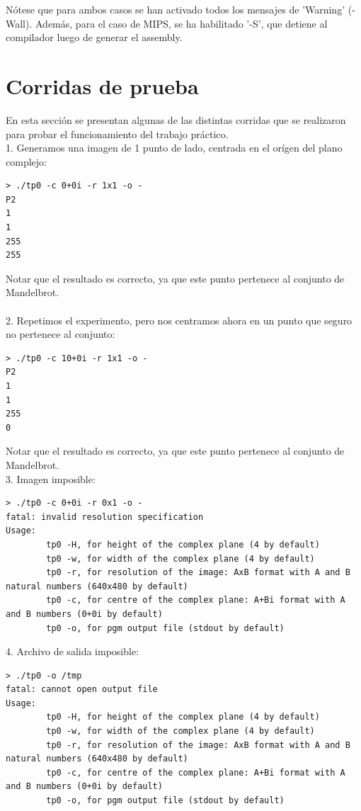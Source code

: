 \documentclass[a4paper,10pt]{article}
\begin{document}
N\'otese que para ambos casos se han activado todos los mensajes de 'Warning' (-Wall). Adem\'as, para el caso de MIPS, se ha habilitado '-S', que detiene al compilador luego de generar el assembly.
\pagebreak




\section{Corridas de prueba}

En esta secci\'on se presentan algunas de las distintas corridas que se
realizaron para probar el funcionamiento del trabajo pr\'actico.\\

1. Generamos una imagen de 1 punto de lado, centrada en el or\'igen del plano complejo:
\begin{verbatim}
> ./tp0 -c 0+0i -r 1x1 -o -
P2
1
1
255
255
\end{verbatim}

Notar que el resultado es correcto, ya que este punto pertenece al conjunto de Mandelbrot.\\
\\
2. Repetimos el experimento, pero nos centramos ahora en un punto que seguro no pertenece
al conjunto:
\begin{verbatim}
> ./tp0 -c 10+0i -r 1x1 -o -
P2
1
1
255
0
\end{verbatim}

Notar que el resultado es correcto, ya que este punto pertenece al conjunto de Mandelbrot.
\\
3. Imagen imposible:
\begin{verbatim}
> ./tp0 -c 0+0i -r 0x1 -o -
fatal: invalid resolution specification
Usage:
		tp0 -H, for height of the complex plane (4 by default)
		tp0 -w, for width of the complex plane (4 by default)
		tp0 -r, for resolution of the image: AxB format with A and B natural numbers (640x480 by default)
		tp0 -c, for centre of the complex plane: A+Bi format with A and B numbers (0+0i by default)
		tp0 -o, for pgm output file (stdout by default)
\end{verbatim}


4. Archivo de salida imposible:
\begin{verbatim}
> ./tp0 -o /tmp
fatal: cannot open output file
Usage:
		tp0 -H, for height of the complex plane (4 by default)
		tp0 -w, for width of the complex plane (4 by default)
		tp0 -r, for resolution of the image: AxB format with A and B natural numbers (640x480 by default)
		tp0 -c, for centre of the complex plane: A+Bi format with A and B numbers (0+0i by default)
		tp0 -o, for pgm output file (stdout by default)
\end{verbatim}
\end{document}
